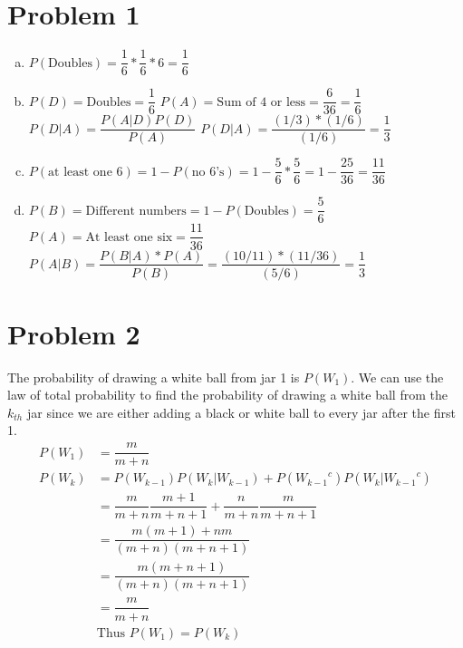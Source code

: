 \documentclass{article}
\begin{document}
\begin{flushleft}
\section*{Problem 1}
\begin{enumerate}[(a)]
\item $P(\text{Doubles})=\dfrac{1}{6}*\dfrac{1}{6}*6=\dfrac{1}{6}$
\item $P(D) = \text{Doubles}=\dfrac{1}{6}$ \quad $P(A)=\text{Sum of 4 or less}=\dfrac{6}{36}=\dfrac{1}{6}$\medbreak
$P(D|A)=\dfrac{P(A|D)P(D)}{P(A)}$\medbreak
$P(D|A)=\dfrac{(1/3)*(1/6)}{(1/6)}=\dfrac{1}{3}$
\item $P(\text{at least one 6})=1-P(\text{no 6's})=1-\dfrac{5}{6}*\dfrac{5}{6}=1-\dfrac{25}{36}=\dfrac{11}{36}$
\item $P(B)=\text{Different numbers}=1-P(\text{Doubles}) =\dfrac{5}{6}$ \quad $P(A)=\text{At least one six}=\dfrac{11}{36}$\medbreak
$P(A|B)= \dfrac{P(B|A)*P(A)}{P(B)}=\dfrac{(10/11)*(11/36)}{(5/6)}=\dfrac{1}{3}$
\end{enumerate}

\section*{Problem 2}
The probability of drawing a white ball from jar 1 is $P(W_1)$. We can use the law of total probability to find the probability of drawing a white ball from the $k_{th}$ jar since we are either adding a black or white ball to every jar after the first 1.
\begin{align*}
P(W_1)&=\dfrac{m}{m+n}\\
P(W_k)&=P(W_{k-1})P(W_k|W_{k-1})+P({W_{k-1}}^c)P(W_k|{W_{k-1}}^c)\\
&=\dfrac{m}{m+n}\dfrac{m+1}{m+n+1}+\dfrac{n}{m+n}\dfrac{m}{m+n+1}\\
&=\dfrac{m(m+1)+nm}{(m+n)(m+n+1)}\\
&=\dfrac{m(m+n+1)}{(m+n)(m+n+1)}\\
&=\dfrac{m}{m+n}\\
&\text{Thus } P(W_1)=P(W_k)
\end{align*}
\pagebreak

\end{flushleft}
\end{document}
